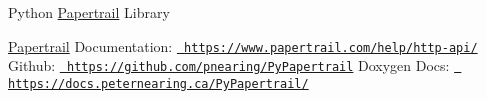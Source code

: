 Python \mbox{\hyperlink{namespacePapertrail}{Papertrail}} Library

\mbox{\hyperlink{namespacePapertrail}{Papertrail}} Documentation\+: \href{https://www.papertrail.com/help/http-api/}{\texttt{ https\+://www.\+papertrail.\+com/help/http-\/api/}} Github\+: \href{https://github.com/pnearing/PyPapertrail}{\texttt{ https\+://github.\+com/pnearing/\+Py\+Papertrail}} Doxygen Docs\+: \href{https://docs.peternearing.ca/PyPapertrail/}{\texttt{ https\+://docs.\+peternearing.\+ca/\+Py\+Papertrail/}} 